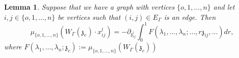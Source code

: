 \documentclass[11pt]{amsart}
\newtheorem{lem}[thm]{Lemma}
\theoremstyle{definition}
\theoremstyle{remark}
\numberwithin{equation}{section}
\begin{document}
\begin{lem}\label{IntegralR}
  Suppose that we have a graph with vertices $\{o,1,\dots,n\}$ and let $i,j \in \{o,1,\dots,n\}$ be vertices such that
  $(i,j)\in E_{\Gamma}$ is an edge. Then
  $$
  \mu_{\{o,1,\dots, n\}}\left(W_{\Gamma}(\mathfrak{z}_{e})\cdot x^l_{ij}\right)=-\partial_{\mathfrak{z}^l_{ij}}\int^1_0F(\lambda_1,\dots,\lambda_{n};\dots,r \mathfrak{z}_{ij},\dots)dr,
  $$
  where $F(\lambda_1,\dots,\lambda_{n};\mathfrak{z}_e):=\mu_{\{o,1,\dots, n\}}\left(W_{\Gamma}(\mathfrak{z}_{e})\right)$
\end{lem}
\begin{figure}[htp]
  \centering



\begin{tikzpicture}[x=0.75pt,y=0.75pt,yscale=-1,xscale=1]


\end{tikzpicture}
\end{figure}
\end{document}
